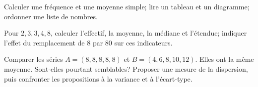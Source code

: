 \begin{prerequis}
Calculer une fréquence et une moyenne simple; lire un tableau et un diagramme;
ordonner une liste de nombres.
\end{prerequis}
\begin{automatismes}
Pour $2,3,3,4,8$, calculer l'effectif, la moyenne, la médiane et l'étendue;
indiquer l'effet du remplacement de $8$ par $80$ sur ces indicateurs.
\end{automatismes}
\begin{activite}
Comparer les séries $A=(8,8,8,8,8)$ et $B=(4,6,8,10,12)$. Elles ont la même
moyenne. Sont-elles pourtant semblables? Proposer une mesure de la dispersion,
puis confronter les propositions à la variance et à l'écart-type.
\end{activite}

